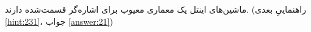 \section{}
\paragraph{}\label{hint:130}
ماشین‌های اینتل یک معماری معیوب برای اشاره‌گر قسمت‌شده دارند. (راهنماییِ بعدی \ref{hint:231}، جواب \ref{answer:21})